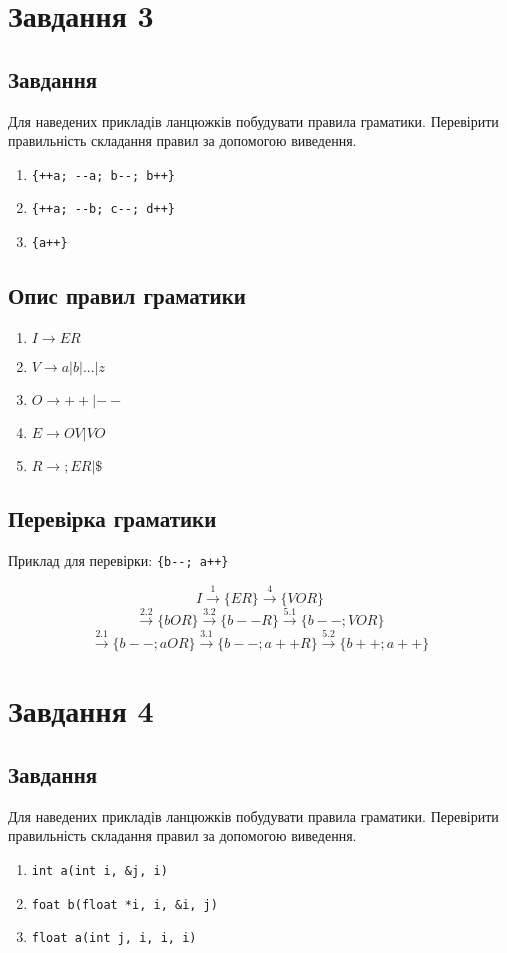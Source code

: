 \section{Завдання 3}
\subsection{Завдання}
Для наведених прикладів ланцюжків побудувати правила граматики. 
Перевірити правильність складання правил за допомогою виведення. 
\begin{enumerate}
    \item \verb|{++a; --a; b--; b++}|
    \item \verb|{++a; --b; c--; d++}|
    \item \verb|{a++}|
\end{enumerate}


\subsection{Опис правил граматики}
\begin{enumerate}
    \item $I \to {ER} $
    \item $V \to a | b | ... | z $
    \item $O \to ++ | -- $
    \item $E \to OV | VO$
    \item $R \to ;ER | \$ $
\end{enumerate}


\subsection{Перевірка граматики}
Приклад для перевірки: \verb|{b--; a++}|

$$
I \xrightarrow{1} \{ER\}
\xrightarrow{4} \{VOR\}
$$
$$
\xrightarrow{2.2} \{bOR\}
\xrightarrow{3.2} \{b--R\}
\xrightarrow{5.1} \{b--; VOR\}
$$
$$
\xrightarrow{2.1} \{b--; aOR\}
\xrightarrow{3.1} \{b--; a++R\}
\xrightarrow{5.2} \{b++; a++\}
$$



\section{Завдання 4}
\subsection{Завдання}
Для наведених прикладів ланцюжків побудувати правила граматики. 
Перевірити правильність складання правил за допомогою виведення. 
\begin{enumerate}
    \item \verb|int a(int i, &j, i)|
    \item \verb|foat b(float *i, i, &i, j)|
    \item \verb|float a(int j, i, i, i)|
\end{enumerate}


